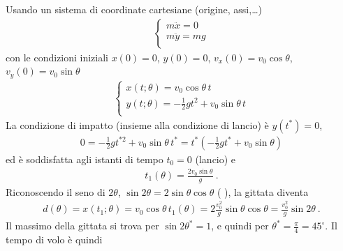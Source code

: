 \documentclass[letterpaper,10pt,italian]{jupyterBook}
\begin{document}
\sphinxAtStartPar
{} Usando un sistema di coordinate cartesiane (origine, assi,…)
\begin{equation*}
\begin{split}\begin{cases}
 m \ddot{x} = 0 \\
 m \ddot{y} = m g \\
\end{cases}\end{split}
\end{equation*}
\sphinxAtStartPar
con le condizioni iniziali \(x(0) = 0\), \(y(0) = 0\), \(v_x(0) = v_0 \cos \theta\), \(v_y(0) = v_0 \sin \theta\)
\begin{equation*}
\begin{split}\begin{cases}
 x(t; \theta) = v_0 \cos \theta \, t \\
 y(t; \theta) = - \frac{1}{2} g t^2 + v_0 \sin \theta \, t \\
\end{cases}\end{split}
\end{equation*}
\sphinxAtStartPar
La condizione di impatto (insieme alla condizione di lancio) è \(y(t^*) = 0\),
\begin{equation*}
\begin{split}0 = -\frac{1}{2} g t^{* 2} + v_0 \sin \theta \, t^* = t^* \left( -\frac{1}{2} g t^* + v_0 \sin \theta \right)\end{split}
\end{equation*}
\sphinxAtStartPar
ed è soddisfatta agli istanti di tempo \(t_0 = 0\) (lancio) e
\begin{equation*}
\begin{split}t_1(\theta) = \frac{2 v_0 \sin \theta}{g} \ .\end{split}
\end{equation*}
\sphinxAtStartPar
Riconoscendo il seno di \(2 \theta\), \(\sin 2 \theta = 2 \sin \theta \cos \theta \) ( ), la gittata diventa
\begin{equation*}
\begin{split}d(\theta) = x(t_1;\theta) = v_0 \cos \theta \, t_1(\theta) = 2 \frac{v_0^2}{g} \sin \theta \cos \theta = \frac{v^2_0}{g} \sin 2 \theta \ .\end{split}
\end{equation*}
\sphinxAtStartPar
Il massimo della gittata si trova per \(\sin 2 \theta^* = 1\), e quindi per \(\theta^* = \frac{\pi}{4} = 45^\circ\). Il tempo di volo è quindi
\end{document}
